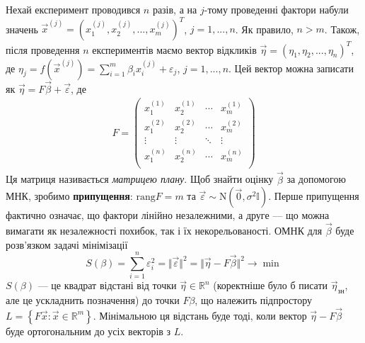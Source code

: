 Нехай експеримент проводився $n$ разів, а на $j$-тому проведенні фактори набули значень
$\vec{x}^{(j)} = \left(x_1^{(j)}, x_2^{(j)}, ..., x_m^{(j)}\right)^T$, $j=1,...,n$. Як правило, $n > m$.
Також, після проведення $n$ експериментів маємо вектор відкликів
$\vec{\eta} = \left(\eta_1, \eta_2, ..., \eta_n\right)^T$, де
$\eta_j = f\left(\vec{x}^{(j)}\right) = \sum\limits_{i=1}^m \beta_i x_i^{(j)} + \varepsilon_j$, $j=1,...,n$.
Цей вектор можна записати як $\vec{\eta} = F\vec{\beta} + \vec{\varepsilon}$, де
\begin{gather}
    F = \begin{pmatrix}
        x_1^{(1)} & x_2^{(1)} & \cdots & x_m^{(1)} \\
        x_1^{(2)} & x_2^{(2)} & \cdots & x_m^{(2)} \\
        \vdots & \vdots & \ddots & \vdots \\
        x_1^{(n)} & x_2^{(n)} & \cdots & x_m^{(n)} \\
    \end{pmatrix}
\end{gather}
Ця матриця називається \emph{матрицею плану}. Щоб знайти оцінку $\vec{\beta}$ за допомогою МНК,
зробимо \textbf{припущення}: $\mathrm{rang}{F} = m$ та $\vec{\varepsilon} \sim \mathrm{N}(\vec{0}, \sigma^2 \mathbb{I})$.
Перше припущення фактично означає, що фактори лінійно незалежними, а друге --- що можна вимагати як незалежності похибок,
так і їх некорельованості. 
ОМНК для $\vec{\beta}$ буде розв'язком задачі мінімізації 
$$S(\beta) = \sum\limits_{i=1}^n \varepsilon_i^2 = \Vert\vec{{\varepsilon}}\Vert^2 = 
\Vert \vec{\eta} - F \vec{\beta} \Vert^2 \to \min$$
$S(\beta)$ --- це квадрат відстані від точки $\vec{\eta} \in \mathbb{R}^n$ (коректніше було б писати $\vec{\eta}_\text{зн}$,
але це ускладнить позначення) до точки $F\beta$, що належить підпростору 
$L = \left\{F \vec{x} : \vec{x} \in \mathbb{R}^m \right\}$.
Мінімальною ця відстань буде тоді, коли вектор $\vec{\eta} - F\vec{\beta}$ буде ортогональним
до усіх векторів з $L$.
\begin{center}
\end{center}
